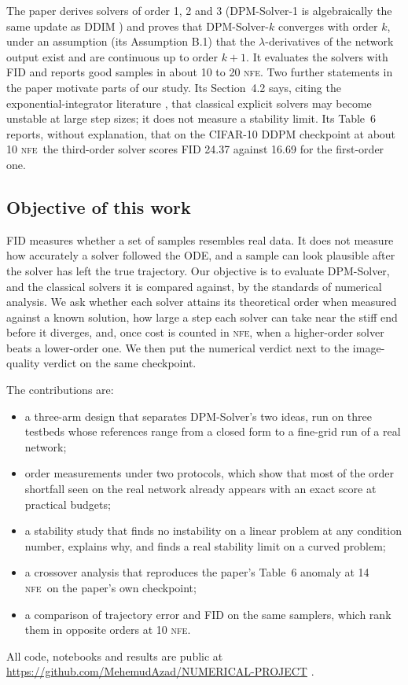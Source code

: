 \documentclass[sigconf]{acmart}
\newcommand{\NFE}{\textsc{nfe}}
\newcommand{\lam}{\lambda}
\begin{document}
The paper derives solvers of order 1, 2 and 3 (DPM-Solver-1 is algebraically
the same update as DDIM \cite{song2021ddim}) and proves that DPM-Solver-$k$
converges with order $k$, under an assumption (its Assumption B.1) that the
$\lam$-derivatives of the network output exist and are continuous up to order
$k+1$. It evaluates the solvers with FID \cite{heusel2017fid} and reports good
samples in about 10 to 20 \NFE. Two further statements in the paper motivate
parts of our study. Its Section~4.2 says, citing the exponential-integrator
literature \cite{hochbruck2010exponential}, that classical explicit solvers may
become unstable at large step sizes; it does not measure a stability limit. Its
Table~6 reports, without explanation, that on the CIFAR-10 DDPM checkpoint at
about 10 \NFE\ the third-order solver scores FID 24.37 against 16.69 for the
first-order one.

\subsection{Objective of this work}

FID measures whether a set of samples resembles real data. It does not measure
how accurately a solver followed the ODE, and a sample can look plausible after
the solver has left the true trajectory. Our objective is to evaluate
DPM-Solver, and the classical solvers it is compared against, by the standards
of numerical analysis. We ask whether each solver attains its theoretical
order when measured against a known solution, how large a step each solver can
take near the stiff end before it diverges, and, once cost is counted in
\NFE, when a higher-order solver beats a lower-order one. We then put the
numerical verdict next to the image-quality verdict on the same checkpoint.

The contributions are:
\begin{itemize}
\item a three-arm design that separates DPM-Solver's two ideas, run on three
  testbeds whose references range from a closed form to a fine-grid run of a
  real network;
\item order measurements under two protocols, which show that most of the
  order shortfall seen on the real network already appears with an exact score
  at practical budgets;
\item a stability study that finds no instability on a linear problem at any
  condition number, explains why, and finds a real stability limit on a curved
  problem;
\item a crossover analysis that reproduces the paper's Table~6 anomaly at 14
  \NFE\ on the paper's own checkpoint;
\item a comparison of trajectory error and FID on the same samplers, which rank
  them in opposite orders at 10 \NFE.
\end{itemize}
All code, notebooks and results are public at
\url{https://github.com/MehemudAzad/NUMERICAL-PROJECT} \cite{ourrepo}.
\end{document}
